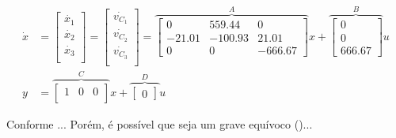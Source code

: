 	\begin{subequations}\label{eq-group1}
		\begin{align}
			\label{eq-lalala}
			\dot{x}
			&=	\begin{bmatrix}
				\dot{x_1} \\
				\dot{x_2} \\
				\dot{x_3} \\
			\end{bmatrix}
			=	\begin{bmatrix}
				\dot{v_{C_1}} \\
				\dot{v_{C_2}} \\
				\dot{v_{C_3}} \\
			\end{bmatrix}
			=	\overbrace{
				\begin{bmatrix}
					0 & 559.44 & 0 \\
					-21.01 & -100.93 & 21.01 \\
					0 & 0 & -666.67
			\end{bmatrix}}^{A} x
			+	\overbrace{
				\begin{bmatrix}
					0 \\
					0 \\
					666.67
			\end{bmatrix}}^{B} u \\
			\label{eq-ssplanta_final}
			y
			&=	\overbrace{
				\begin{bmatrix}
					1 & 0 & 0 \\
			\end{bmatrix}}^{C} x
			+	\overbrace{
				\begin{bmatrix}
					0
			\end{bmatrix}}^{D} u
		\end{align}
	\end{subequations}

    Conforme ... Porém, é possível que seja um grave equívoco (\cite{ref:adolph})...